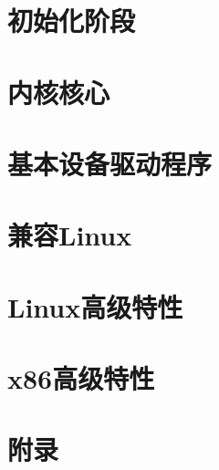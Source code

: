 \documentclass[b5paper,9pt,twoside,openany]{book}
\begin{document}
 

\frontmatter

\setcounter{tocdepth}{3}
\tableofcontents


\mainmatter
\part{初始化阶段}





\part{内核核心}



\part{基本设备驱动程序}







\part{兼容Linux}



\part{Linux高级特性}






\part{x86高级特性}



\part{附录}
\appendix


 
 
 





\backmatter
\end{document}
